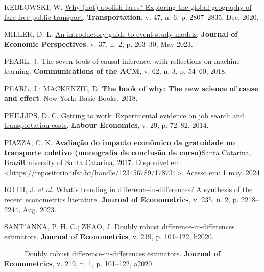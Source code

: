 \documentclass[12pt, a4paper, twoside]{article}
\numberwithin{equation}{subsection} %
\newlength{\cslhangindent}
\newlength{\cslentryspacingunit} %
\newenvironment{CSLReferences}[2] %
 {%
  \setlength{\parindent}{0pt}
  \ifodd #1
  \let\oldpar\par
  \def\par{\hangindent=\cslhangindent\oldpar}
  \fi
  \setlength{\parskip}{#2\cslentryspacingunit}
 }%
 {}
\begin{document}
\begin{CSLReferences}{0}{0}
\leavevmode{}%
KĘBŁOWSKI, W. \href{https://doi.org/10.1007/s11116-019-09986-6}{Why
(not) abolish fares? {Exploring} the global geography of fare-free
public transport}. \textbf{Transportation}, v. 47, n. 6, p. 2807--2835,
Dec. 2020.

\leavevmode{}%
MILLER, D. L. \href{https://doi.org/10.1257/jep.37.2.203}{An
introductory guide to event study models}. \textbf{Journal of Economic
Perspectives}, v. 37, n. 2, p. 203--30, May 2023.

\leavevmode{}%
PEARL, J. The seven tools of causal inference, with reflections on
machine learning. \textbf{Communications of the ACM}, v. 62, n. 3, p.
54--60, 2018.

\leavevmode{}%
PEARL, J.; MACKENZIE, D. \textbf{The book of why: The new science of
cause and effect}. New York: Basic Books, 2018.

\leavevmode{}%
PHILLIPS, D. C.
\href{https://doi.org/10.1016/j.labeco.2014.07.005}{Getting to work:
Experimental evidence on job search and transportation costs}.
\textbf{Labour Economics}, v. 29, p. 72--82, 2014.

\leavevmode{}%
PIAZZA, C. K. \textbf{Avaliação do impacto econômico da gratuidade no
transporte coletivo (monografia de conclusão de curso)}Santa Catarina,
BrazilUniversity of Santa Catarina, 2017. Disponível em:
\textless{}\url{https://repositorio.ufsc.br/handle/123456789/178734}\textgreater.
Acesso em: 1 may. 2024

\leavevmode{}%
ROTH, J. \emph{et al.}
\href{https://doi.org/10.1016/j.jeconom.2023.03.008}{What's trending in
difference-in-differences? {A} synthesis of the recent econometrics
literature}. \textbf{Journal of Econometrics}, v. 235, n. 2, p.
2218--2244, Aug. 2023.

\leavevmode{}%
SANT'ANNA, P. H. C.; ZHAO, J.
\href{https://doi.org/10.1016/j.jeconom.2020.06.003}{Doubly robust
difference-in-differences estimators}. \textbf{Journal of Econometrics},
v. 219, p. 101--122, b2020.

\leavevmode{}%
\_\_\_. \href{https://doi.org/10.1016/j.jeconom.2020.06.003}{Doubly
robust difference-in-differences estimators}. \textbf{Journal of
Econometrics}, v. 219, n. 1, p. 101--122, a2020.


\end{CSLReferences}
\end{document}
